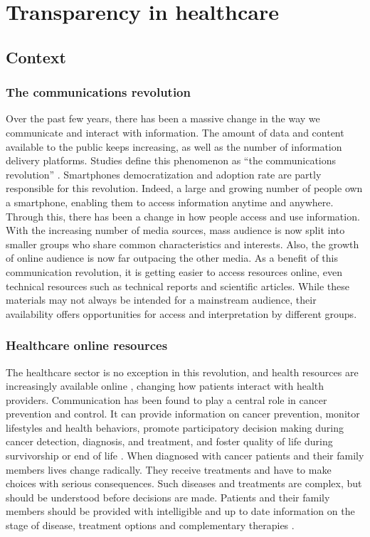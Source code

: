 \chapter{Transparency in healthcare}

\section{Context}

\subsection{The communications revolution}

Over the past few years, there has been a massive change in the way we
communicate and interact with information. The amount of data and content
available to the public keeps increasing, as well as the number of information
delivery platforms. Studies define this phenomenon as ``the communications
revolution'' \cite{viswanath_communications_2012}. Smartphones democratization
and adoption rate are partly responsible for this revolution. Indeed, a large
and growing number of people own a smartphone, enabling them to access
information anytime and anywhere. Through this, there has been a change in how
people access and use information. With the increasing number of media sources,
mass audience is now split into smaller groups who share common characteristics
and interests. Also, the growth of online audience is now far outpacing the
other media. As a benefit of this communication revolution, it is getting easier
to access resources online, even technical resources such as technical reports
and scientific articles. While these materials may not always be intended for a
mainstream audience, their availability offers opportunities for access and
interpretation by different groups.

\subsection{Healthcare online resources}

The healthcare sector is no exception in this revolution, and health resources
are increasingly available online
\cite{viswanath_science_2005,viswanath_communications_2012}, changing how
patients interact with health providers. Communication has been found to play a
central role in cancer prevention and control. It can provide information on
cancer prevention, monitor lifestyles and health behaviors, promote
participatory decision making during cancer detection, diagnosis, and treatment,
and foster quality of life during survivorship or end of life
\cite{viswanath_communications_2012}. When diagnosed with cancer patients and
their family members lives change radically. They receive treatments and have to
make choices with serious consequences. Such diseases and treatments are
complex, but should be understood before decisions are made. Patients and their
family members should be provided with intelligible and up to date information
on the stage of disease, treatment options and complementary therapies
\cite{butow_dynamics_1997,cassileth_information_1980}.

